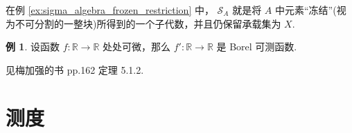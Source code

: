 \documentclass[12pt, a4paper, oneside]{book}
\numberwithin{figure}{section}
\theoremstyle{definition}
\newtheorem{example}[theorem]{例}
\begin{document}
在例 \ref{ex:sigma_algebra_frozen_restriction} 中，
$\mathcal S_A$ 就是将 $A$ 中元素``冻结''(视为不可分割的一整块)所得到的一个子代数，并且仍保留承载集为 $X.$ 



\begin{example}
    设函数 $f:\mathbb R\to\mathbb R$ 处处可微，那么 $f':\mathbb R\to\mathbb R$ 是 Borel 可测函数.
\end{example}

见梅加强的书 \cite{Mei_2011} pp.162 定理 5.1.2.




\section{测度}

\nocite{*}


\end{document}
